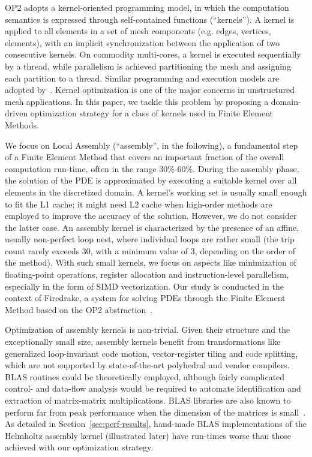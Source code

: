 \documentclass[conference]{IEEEtran}
\begin{document}
OP2 adopts a kernel-oriented programming model, in which the computation semantics is expressed through self-contained functions (``kernels''). A kernel is applied to all elements in a set of mesh components (e.g. edges, vertices, elements), with an implicit synchronization between the application of two consecutive kernels. On commodity multi-cores, a kernel is executed sequentially by a thread, while parallelism is achieved partitioning the mesh and assigning each partition to a thread. Similar programming and execution models are adopted by~\cite{fenics, fluidity, lizst}. Kernel optimization is one of the major concerns in unstructured mesh applications. In this paper, we tackle this problem by proposing a domain-driven optimization strategy for a class of kernels used in Finite Element Methods.

We focus on Local Assembly (``assembly'', in the following), a fundamental step of a Finite Element Method that covers an important fraction of the overall computation run-time, often in the range 30$\%$-60$\%$. During the assembly phase, the solution of the PDE is approximated by executing a suitable kernel over all elements in the discretized domain. A kernel's working set is usually small enough to fit the L1 cache; it might need L2 cache when high-order methods are employed to improve the accuracy of the solution. However, we do not consider the latter case. An assembly kernel is characterized by the presence of an affine, usually non-perfect loop nest, where individual loops are rather small (the trip count rarely exceeds 30, with a minimum value of 3, depending on the order of the method). With such small kernels, we focus on aspects like minimization of floating-point operations, register allocation and instruction-level parallelism, especially in the form of SIMD vectorization. Our study is conducted in the context of Firedrake, a system for solving PDEs through the Finite Element Method based on the OP2 abstraction~\cite{firedrake}.

Optimization of assembly kernels is non-trivial. Given their structure and the exceptionally small size, assembly kernels benefit from transformations like generalized loop-invariant code motion, vector-register tiling and code splitting, which are not supported by state-of-the-art polyhedral and vendor compilers. BLAS routines could be theoretically employed, although fairly complicated control- and data-flow analysis would be required to automate identification and extraction of matrix-matrix multiplications. BLAS libraries are also known to perform far from peak performance when the dimension of the matrices is small~\cite{nek5000}. As detailed in Section~\ref{sec:perf-results}, hand-made BLAS implementations of the Helmholtz assembly kernel (illustrated later) have run-times worse than those achieved with our optimization strategy. 
\end{document}
